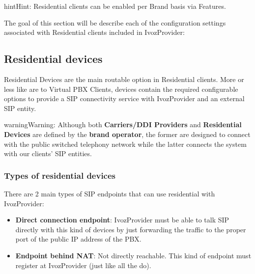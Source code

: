 \documentclass[letterpaper,10pt,english]{sphinxmanual}
\begin{document}
\begin{notice}{hint}{Hint:}
Residential clients can be enabled per Brand basis via Features.
\end{notice}

The goal of this section will be describe each of the configuration settings
associated with Residential clients included in IvozProvider:


\subsection{Residential devices}
\label{administration_portal/client/residential/residential_devices:id1}\label{administration_portal/client/residential/residential_devices::doc}\label{administration_portal/client/residential/residential_devices:residential-devices}
Residential Devices are the main routable option in Residential clients.
More or less like {\hyperref[administration_portal/client/vpbx/routing_endpoints/friends/index:friends]{}} are to Virtual PBX Clients, devices
contain the required configurable options to provide a SIP connectivity
service with IvozProvider and an external SIP entity.

\begin{notice}{warning}{Warning:}
Although both \textbf{Carriers/DDI Providers} and \textbf{Residential Devices} are defined by the
\textbf{brand operator}, the former are designed to connect with the public switched telephony network
while the latter connects the system with our clients' SIP entities.
\end{notice}


\subsubsection{Types of residential devices}
\label{administration_portal/client/residential/residential_devices:types-of-residential-devices}
There are 2 main types of SIP endpoints that can use residential with IvozProvider:
\begin{itemize}
\item {} 
\textbf{Direct connection endpoint}: IvozProvider must be able to talk SIP directly with
this kind of devices by just forwarding the traffic to the proper port of
the public IP address of the PBX.

\item {} 
\textbf{Endpoint behind NAT}: Not directly reachable. This kind of endpoint must register at
IvozProvider (just like all the {\hyperref[administration_portal/client/vpbx/terminals:terminals]{}} do).

\end{itemize}
\end{document}
